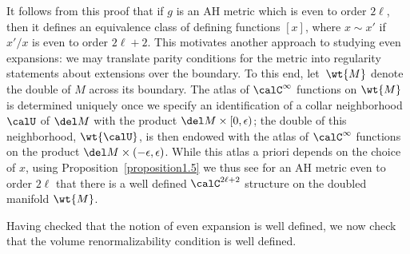 It follows from this proof that if $g$ is an AH metric which is even to order $2\ell$, then it defines an equivalence class of defining functions $[x]$, where $x \sim x'$ if $x'/x$ is even to order $2\ell+2$. This motivates another approach to studying even expansions: we may translate parity conditions for the metric into regularity statements about extensions over the boundary. To this end, let~$\wt{M}$ denote the double of $M$ across its boundary. The
atlas of $\calC^\infty$ functions on $\wt{M}$ is determined uniquely once we specify an identification of a collar neighborhood
$\calU$ of $\del M$ with the product $\del M \times [0,\epsilon)$; the double of this neighborhood, $\wt{\calU}$, is then
endowed with the atlas of $\calC^\infty$ functions on the product $\del M \times (-\epsilon, \epsilon)$. While this atlas a priori depends on the choice of $x$, using Proposition~\ref{proposition1.5} we thus see for an AH metric even to order $2 \ell$ that there is a well defined $\calC^{2\ell+2}$ structure on the doubled manifold $\wt{M}$.

Having checked that the notion of even expansion is well defined, we now check that the volume renormalizability condition is well defined.

